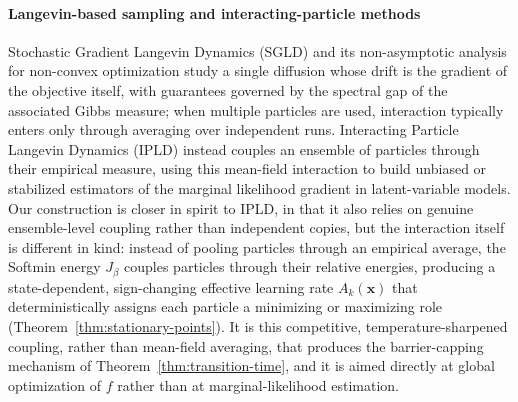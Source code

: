 \documentclass{opt2026} %
\newcommand{\prefactor}[2]{A_{#1}(#2)}
\newcommand{\xx}{\mathbf{x}}
\begin{document}
\paragraph{Langevin-based sampling and interacting-particle methods}
Stochastic Gradient Langevin Dynamics (SGLD) \citep{welling2011bayesian} and its non-asymptotic analysis for non-convex optimization \citep{raginsky2017nonconvex} study a single diffusion whose drift is the gradient of the objective itself, with guarantees governed by the spectral gap of the associated Gibbs measure; when multiple particles are used, interaction typically enters only through averaging over independent runs. Interacting Particle Langevin Dynamics (IPLD) \citep{akyildiz2025interacting, encinar2025proximal} instead couples an ensemble of particles through their empirical measure, using this mean-field interaction to build unbiased or stabilized estimators of the marginal likelihood gradient in latent-variable models. Our construction is closer in spirit to IPLD, in that it also relies on genuine ensemble-level coupling rather than independent copies, but the interaction itself is different in kind: instead of pooling particles through an empirical average, the Softmin energy $J_\beta$ couples particles through their relative energies, producing a state-dependent, sign-changing effective learning rate $\prefactor{k}{\xx}$ that deterministically assigns each particle a minimizing or maximizing role (Theorem~\ref{thm:stationary-points}). It is this competitive, temperature-sharpened coupling, rather than mean-field averaging, that produces the barrier-capping mechanism of Theorem~\ref{thm:transition-time}, and it is aimed directly at global optimization of $f$ rather than at marginal-likelihood estimation.
\end{document}

